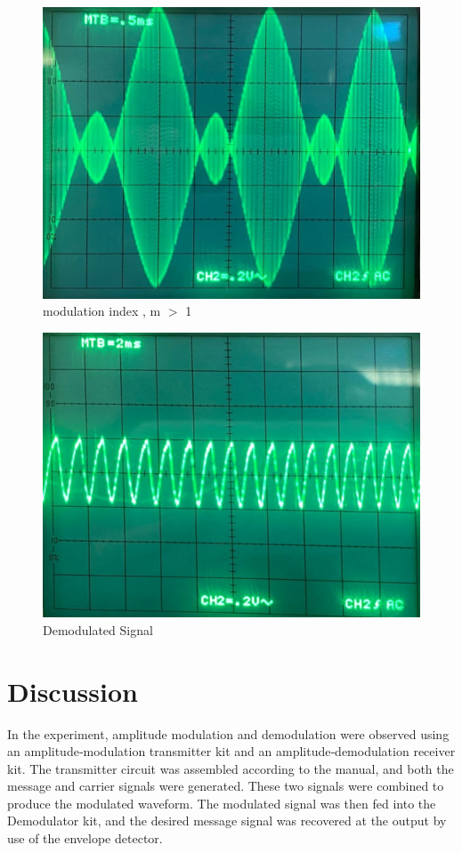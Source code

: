 \documentclass[a4paper,12pt]{article}
\begin{document}
    	\begin{figure}[H]
    	\centering
    	\includegraphics[width=.65\linewidth, height=0.26\textheight]{"Images/5"}
    	\caption{modulation index , m $>$ 1}
    \end{figure}
    
    	\begin{figure}[H]
    	\centering
    	\includegraphics[width=.65\linewidth, height=0.26\textheight]{"Images/6"}
    	\caption{Demodulated Signal}
    \end{figure}
    \section{Discussion}
  In the experiment, amplitude modulation and demodulation were observed using an amplitude‐modulation transmitter kit and an amplitude‐demodulation receiver kit. The transmitter circuit was assembled according to the manual, and both the message and carrier signals were generated. These two signals were combined to produce the modulated waveform. The modulated signal was then fed into the Demodulator kit, and the desired message signal was recovered at the output by use of the envelope detector.
  
    \newpage
    	
\end{document}
